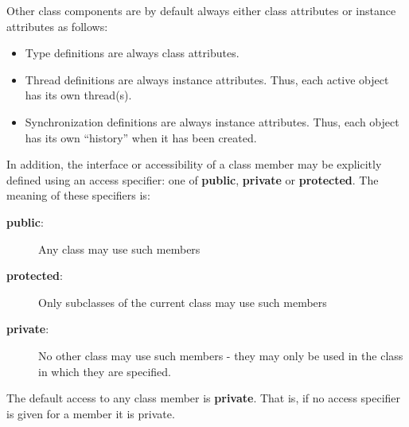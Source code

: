 \documentclass{overturerepchap}
\newcommand{\keyw}[1]{{\bf\ttfamily #1}}
\begin{document}
Other class components are by default always either class attributes
or instance attributes as follows:

\begin{itemize}
\item Type definitions are always class attributes.
\item Thread definitions are always instance attributes. Thus, each active
  object has its own thread(s).
\item Synchronization definitions are always instance attributes. Thus, each
  object has its own ``history'' when it has been created.
\end{itemize}

In addition, the interface or accessibility of a class member may be
explicitly defined using an access specifier: one of \keyw{public},
\keyw{private} or \keyw{protected}. The meaning of these specifiers
is:
\begin{description}
\item[\keyw{public}:] Any class may use such members
\item[\keyw{protected}:] Only subclasses of the current class may use
  such members
\item[\keyw{private}:] No other class may use such members - they may
  only be used in the class in which they are specified.
\end{description}

The default access to any class member is \keyw{private}. That is,
if no access specifier is given for a member it is private.
\end{document}
